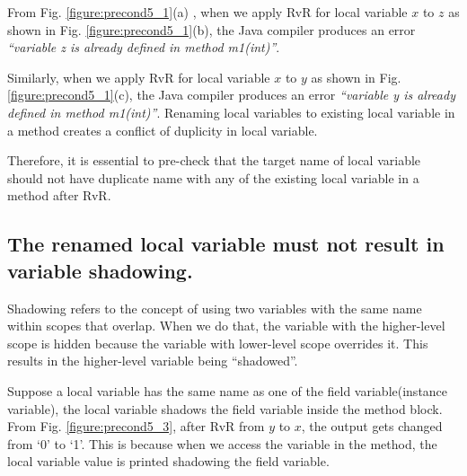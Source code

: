  
From Fig. \ref{figure:precond5_1}(a) , when we apply RvR for local variable $x$ to $z$ as shown in Fig. \ref{figure:precond5_1}(b), the Java compiler produces an error \textit{``variable z is already defined in method m1(int)''}. 

Similarly, when we apply RvR for local variable $x$ to $y$ as shown in Fig. \ref{figure:precond5_1}(c), the Java compiler produces an error \textit{``variable y is already defined in method m1(int)''}. Renaming local variables to existing local variable in a method creates a conflict of duplicity in local variable.

Therefore, it is essential to pre-check that the target name of local variable should not have duplicate name with any of the existing local variable in a method after RvR.


\subsection{The renamed local variable must not result in variable shadowing.}
Shadowing refers to the concept of using two variables with the same name within scopes that overlap. When we do that, the variable with the higher-level scope is hidden because the variable with lower-level scope overrides it. This results in the higher-level variable being ``shadowed''. 

Suppose a local variable has the same name as one of the field variable(instance variable), the local variable shadows the field variable inside the method block. From Fig. \ref{figure:precond5_3}, after RvR from $y$ to $x$, the output gets changed from `0' to `1'. This is because when we access the variable in the method, the local variable value is printed shadowing the field variable.

